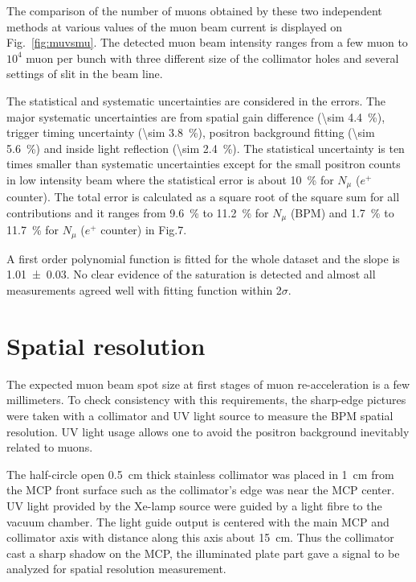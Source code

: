 \documentclass[preprint,3p,twocolumn]{elsarticle}
\begin{document}
The comparison of the number of muons obtained by these two independent methods at various values of the muon beam current is displayed on Fig.~\ref{fig:muvsmu}. The detected muon beam intensity ranges from a few muon to $10^{4}$ muon per bunch with three different size of the collimator holes and several settings of slit in the beam line.

The statistical and systematic uncertainties are considered in the errors. The major systematic uncertainties are from spatial gain difference (\SI{\sim 4.4}{\percent}), trigger timing uncertainty (\SI{\sim 3.8}{\percent}),
positron background fitting (\SI{\sim 5.6}{\percent}) and inside light reflection (\SI{\sim 2.4}{\percent}).
The statistical uncertainty is ten times smaller than systematic uncertainties except for the small positron counts in low intensity beam where the statistical error is about \SI{10}{\percent} for $N_\mu$ ($e^+$ counter).
The total error is calculated as a square root of the square sum for all contributions and it ranges from \SI{9.6}{\percent} to \SI{11.2}{\percent} for $N_\mu$ (BPM) and \SI{1.7}{\percent} to \SI{11.7}{\percent} for $N_\mu$ ($e^+$ counter) in Fig.7.

A first order polynomial function is fitted for the whole dataset and the slope is \num{1.01 \pm 0.03}. No clear evidence of the saturation is detected and almost all measurements agreed well with fitting function within 2$\sigma$.  

\section{Spatial resolution}
 
The expected muon beam spot size at first stages of muon re-acceleration is a few millimeters.
To check consistency with this requirements, the sharp-edge pictures were taken with a collimator and UV light source to measure the BPM spatial resolution.
UV light usage allows one to avoid the positron background inevitably related to muons.

The half-circle open \SI{.5}{\cm} thick stainless collimator was placed in \SI{1}{\cm} from the MCP front surface
such as the collimator's edge was near the MCP center.
UV light provided by the Xe-lamp source were guided by a light fibre to the vacuum chamber.
The light guide output is centered with the main MCP and collimator axis
with distance along this axis about \SI{15}{\cm}.
Thus the collimator cast a sharp shadow on the MCP,
the illuminated plate part gave a signal to be analyzed for spatial resolution measurement.
\end{document}
